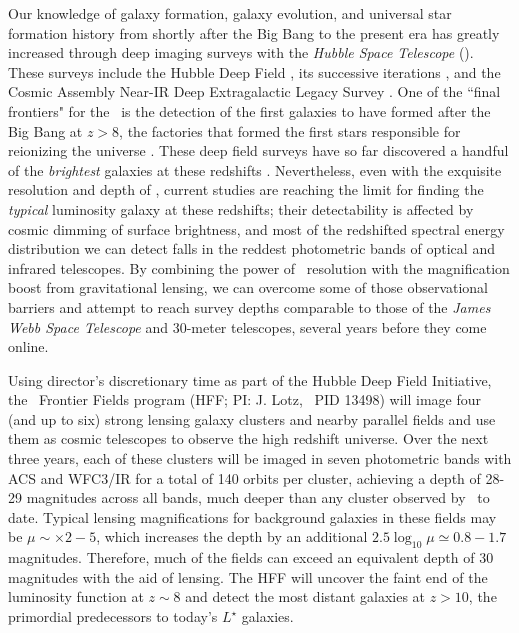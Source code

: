 Our knowledge of galaxy formation, galaxy evolution, and universal star formation history from shortly after the Big Bang to the present era has greatly increased through deep imaging surveys with the \emph{Hubble Space Telescope} (\hst). These surveys include the Hubble Deep Field \citep{Williams:1996vn}, its successive iterations \citep{Beckwith:2006rt, Bouwens:2011ys, Ellis:2013fr, Illingworth:2013yq}, and the Cosmic Assembly Near-IR Deep Extragalactic Legacy Survey \citep[CANDELS;][]{Grogin:2011ly,Koekemoer:2011fk}. One of the ``final frontiers" for the \hst\ is the detection of the first galaxies to have formed after the Big Bang at $z>8$, the factories that formed the first stars responsible for reionizing the universe \citep{Finkelstein:2012bh}. These deep field surveys have so far discovered a handful of the \emph{brightest} galaxies at these redshifts \citep{Ellis:2013fr,Oesch:2013lq}. Nevertheless, even with the exquisite resolution and depth of \hst, current studies are reaching the limit for finding the \emph{typical} luminosity galaxy at these redshifts; their detectability is affected by cosmic dimming of surface brightness, and most of the redshifted spectral energy distribution we can detect falls in the reddest photometric bands of optical and infrared telescopes. By combining the power of \hst\ resolution with the magnification boost from gravitational lensing, we can overcome some of those observational barriers and attempt to reach survey depths comparable to those of the \emph{James Webb Space Telescope} and 30-meter telescopes, several years before they come online.

Using director's discretionary time as part of the Hubble Deep Field Initiative, the \hst\ Frontier Fields program (HFF; PI: J. Lotz, \hst\ PID 13498) will image four (and up to six) strong lensing galaxy clusters and nearby parallel fields and use them as cosmic telescopes to observe the high redshift universe. Over the next three years, each of these clusters will be imaged in seven photometric bands with ACS and WFC3/IR for a total of 140 orbits per cluster, achieving a depth of 28-29 magnitudes across all bands, much deeper than any cluster observed by \hst\ to date. Typical lensing magnifications for background galaxies in these fields may be $\mu\sim\times2-5$, which increases the depth by an additional $2.5\log_{10}\mu\simeq0.8-1.7$ magnitudes. Therefore, much of the fields can exceed an equivalent depth of 30 magnitudes with the aid of lensing. The HFF will uncover the faint end of the luminosity function at $z\sim8$ and detect the most distant galaxies at $z>10$, the primordial predecessors to today's $L^\star$ galaxies.

